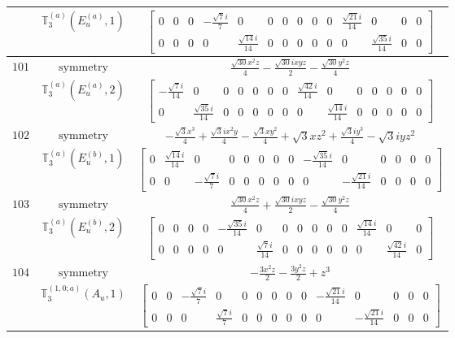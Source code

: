 \documentclass[fleqn,8pt,landscape]{jsarticle}
\begin{document}
\begin{longtable}{ccc}
$  $ & $ \mathbb{T}_{3}^{(a)}(E_{u}^{(a)},1) $ & $ \begin{bmatrix} 0 & 0 & 0 & - \frac{\sqrt{7} i}{7} & 0 & 0 & 0 & 0 & 0 & 0 & \frac{\sqrt{21} i}{14} & 0 & 0 & 0 \\ 0 & 0 & 0 & 0 & \frac{\sqrt{14} i}{14} & 0 & 0 & 0 & 0 & 0 & 0 & \frac{\sqrt{35} i}{14} & 0 & 0 \end{bmatrix} $ \\ \hline
$ 101 $ & $ \text{symmetry} $ & $ \frac{\sqrt{30} x^{2} z}{4} - \frac{\sqrt{30} i x y z}{2} - \frac{\sqrt{30} y^{2} z}{4} $ \\
$  $ & $ \mathbb{T}_{3}^{(a)}(E_{u}^{(a)},2) $ & $ \begin{bmatrix} - \frac{\sqrt{7} i}{14} & 0 & 0 & 0 & 0 & 0 & 0 & \frac{\sqrt{42} i}{14} & 0 & 0 & 0 & 0 & 0 & 0 \\ 0 & \frac{\sqrt{35} i}{14} & 0 & 0 & 0 & 0 & 0 & 0 & \frac{\sqrt{14} i}{14} & 0 & 0 & 0 & 0 & 0 \end{bmatrix} $ \\ \hline
$ 102 $ & $ \text{symmetry} $ & $ - \frac{\sqrt{3} x^{3}}{4} + \frac{\sqrt{3} i x^{2} y}{4} - \frac{\sqrt{3} x y^{2}}{4} + \sqrt{3} x z^{2} + \frac{\sqrt{3} i y^{3}}{4} - \sqrt{3} i y z^{2} $ \\
$  $ & $ \mathbb{T}_{3}^{(a)}(E_{u}^{(b)},1) $ & $ \begin{bmatrix} 0 & \frac{\sqrt{14} i}{14} & 0 & 0 & 0 & 0 & 0 & 0 & - \frac{\sqrt{35} i}{14} & 0 & 0 & 0 & 0 & 0 \\ 0 & 0 & - \frac{\sqrt{7} i}{7} & 0 & 0 & 0 & 0 & 0 & 0 & - \frac{\sqrt{21} i}{14} & 0 & 0 & 0 & 0 \end{bmatrix} $ \\ \hline
$ 103 $ & $ \text{symmetry} $ & $ \frac{\sqrt{30} x^{2} z}{4} + \frac{\sqrt{30} i x y z}{2} - \frac{\sqrt{30} y^{2} z}{4} $ \\
$  $ & $ \mathbb{T}_{3}^{(a)}(E_{u}^{(b)},2) $ & $ \begin{bmatrix} 0 & 0 & 0 & 0 & - \frac{\sqrt{35} i}{14} & 0 & 0 & 0 & 0 & 0 & 0 & \frac{\sqrt{14} i}{14} & 0 & 0 \\ 0 & 0 & 0 & 0 & 0 & \frac{\sqrt{7} i}{14} & 0 & 0 & 0 & 0 & 0 & 0 & \frac{\sqrt{42} i}{14} & 0 \end{bmatrix} $ \\ \hline
$ 104 $ & $ \text{symmetry} $ & $ - \frac{3 x^{2} z}{2} - \frac{3 y^{2} z}{2} + z^{3} $ \\
$  $ & $ \mathbb{T}_{3}^{(1,0;a)}(A_{u},1) $ & $ \begin{bmatrix} 0 & 0 & - \frac{\sqrt{7} i}{7} & 0 & 0 & 0 & 0 & 0 & 0 & - \frac{\sqrt{21} i}{14} & 0 & 0 & 0 & 0 \\ 0 & 0 & 0 & \frac{\sqrt{7} i}{7} & 0 & 0 & 0 & 0 & 0 & 0 & - \frac{\sqrt{21} i}{14} & 0 & 0 & 0 \end{bmatrix} $ \\ \hline

\end{longtable}
\end{document}
